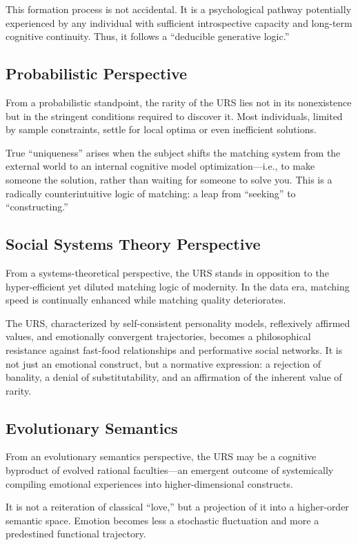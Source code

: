 \documentclass[12pt]{article}
\begin{document}
This formation process is not accidental. It is a psychological pathway potentially experienced by any individual with sufficient introspective capacity and long-term cognitive continuity. Thus, it follows a ``deducible generative logic.''

\subsection{Probabilistic Perspective}

From a probabilistic standpoint, the rarity of the URS lies not in its nonexistence but in the stringent conditions required to discover it. Most individuals, limited by sample constraints, settle for local optima or even inefficient solutions.

True ``uniqueness'' arises when the subject shifts the matching system from the external world to an internal cognitive model optimization—i.e., to make someone the solution, rather than waiting for someone to solve you. This is a radically counterintuitive logic of matching: a leap from ``seeking'' to ``constructing.''

\subsection{Social Systems Theory Perspective}

From a systems-theoretical perspective, the URS stands in opposition to the hyper-efficient yet diluted matching logic of modernity. In the data era, matching speed is continually enhanced while matching quality deteriorates.

The URS, characterized by self-consistent personality models, reflexively affirmed values, and emotionally convergent trajectories, becomes a philosophical resistance against fast-food relationships and performative social networks. It is not just an emotional construct, but a normative expression: a rejection of banality, a denial of substitutability, and an affirmation of the inherent value of rarity.
\subsection{Evolutionary Semantics}

From an evolutionary semantics perspective, the URS may be a cognitive byproduct of evolved rational faculties—an emergent outcome of systemically compiling emotional experiences into higher-dimensional constructs.

It is not a reiteration of classical ``love,'' but a projection of it into a higher-order semantic space. Emotion becomes less a stochastic fluctuation and more a predestined functional trajectory.
\end{document}
